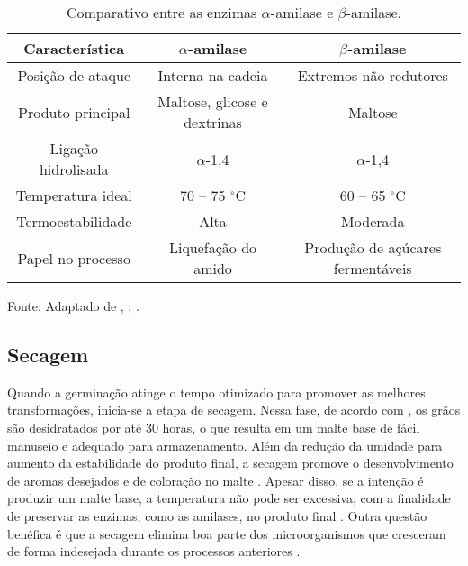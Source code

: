 \begin{table}[ht]
    \caption{Comparativo entre as enzimas $\alpha$-amilase e $\beta$-amilase.}
    \label{tab:amilases}
    \centering
    \begin{tabular}{ccc}
        \hline
        \bfseries Característica & \bfseries $\alpha$-amilase & \bfseries $\beta$-amilase \\
        \hline
        Posição de ataque & Interna na cadeia & Extremos não redutores \\
        Produto principal & Maltose, glicose e dextrinas & Maltose \\
        Ligação hidrolisada & $\alpha$-1,4 & $\alpha$-1,4 \\
        Temperatura ideal & 70 -- 75 $^{\circ}$C & 60 -- 65 $^{\circ}$C \\
        Termoestabilidade & Alta & Moderada \\
        Papel no processo & Liquefação do amido & Produção de açúcares fermentáveis \\
        \hline
    \end{tabular}

    {\centering\footnotesize Fonte: Adaptado de , , .\par}
\end{table}



\subsection{Secagem}

Quando a germinação atinge o tempo otimizado para promover as melhores transformações, inicia-se a etapa de secagem. Nessa fase, de acordo com , os grãos são desidratados por até 30 horas, o que resulta em um malte base de fácil manuseio e adequado para armazenamento. Além da redução da umidade para aumento da estabilidade do produto final, a secagem promove o desenvolvimento de aromas desejados e de coloração no malte \cite{BAMFORTH2003}. Apesar disso, se a intenção é produzir um malte base, a temperatura não pode ser excessiva, com a finalidade de preservar as enzimas, como as amilases, no produto final \cite{LEWIS2012}. Outra questão benéfica é que a secagem elimina boa parte dos microorganismos que cresceram de forma indesejada durante os processos anteriores \cite{DOUGLAS1988, PETTERS1988}. 




